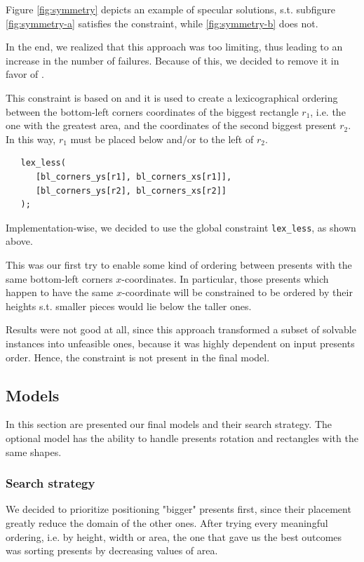 \documentclass[a4paper,10pt]{article}
\newcounter{subsubsubsection}[subsubsection]
\begin{document}
Figure \ref{fig:symmetry} depicts an example of specular solutions, s.t. subfigure \ref{fig:symmetry-a} satisfies the constraint, while \ref{fig:symmetry-b} does not.

In the end, we realized that this approach was too limiting, thus leading to an increase in the number of failures. Because of this, we decided to remove it in favor of .

 \label{sec:areas-ordering}
This constraint is based on \cite{sweep} and it is used to create a lexicographical ordering between the bottom-left corners coordinates of the biggest rectangle $r_{1}$, i.e. the one with the greatest area, and the coordinates of the second biggest present $r_{2}$.
In this way, $r_{1}$ must be placed below and/or to the left of $r_{2}$.

\begin{verbatim}
   lex_less(
      [bl_corners_ys[r1], bl_corners_xs[r1]],
      [bl_corners_ys[r2], bl_corners_xs[r2]]
   );
\end{verbatim}

Implementation-wise, we decided to use the global constraint \texttt{lex\_less}, as shown above.

 \label{sec:width-ordering}
This was our first try to enable some kind of ordering between presents with the same bottom-left corners $x$-coordinates.
In particular, those presents which happen to have the same $x$-coordinate will be constrained to be ordered by their heights s.t. smaller pieces would lie below the taller ones.

Results were not good at all, since this approach transformed a subset of solvable instances into unfeasible ones, because it was highly dependent on input presents order. Hence, the constraint is not present in the final model.

\subsection{Models}
In this section are presented our final models and their search strategy. The optional model has the ability to handle presents rotation and rectangles with the same shapes.
\subsubsection*{Search strategy}
We decided to prioritize positioning "bigger" presents first, since their placement greatly reduce the domain of the other ones. After trying every meaningful ordering, i.e. by height, width or area, the one that gave us the best outcomes was sorting presents by decreasing values of area.
\end{document}
